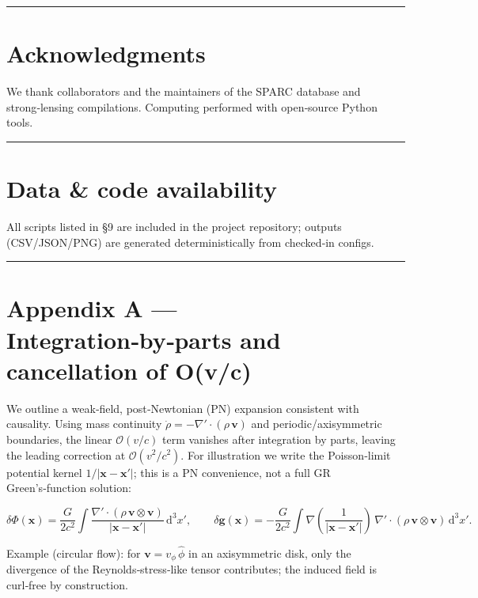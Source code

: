 \documentclass[11pt,a4paper]{article}
\begin{document}
\medskip\hrule\medskip


\section{Acknowledgments}


We thank collaborators and the maintainers of the SPARC database and strong‑lensing compilations. Computing performed with open‑source Python tools.


\medskip\hrule\medskip


\section{Data \& code availability}


All scripts listed in §9 are included in the project repository; outputs (CSV/JSON/PNG) are generated deterministically from checked‑in configs.


\medskip\hrule\medskip


\section{Appendix A — Integration‑by‑parts and cancellation of O(v/c)}


We outline a weak‑field, post‑Newtonian (PN) expansion consistent with causality. Using mass continuity $\dot\rho=-\nabla'\!\cdot(\rho\,\mathbf{v})$ and periodic/axisymmetric boundaries, the linear $\mathcal{O}(v/c)$ term vanishes after integration by parts, leaving the leading correction at $\mathcal{O}(v^2/c^2)$. For illustration we write the Poisson‑limit potential kernel $1/\lvert \mathbf{x}-\mathbf{x}'\rvert$; this is a PN convenience, not a full GR Green’s‑function solution:


\begin{equation}
\delta\Phi(\mathbf{x}) = \frac{G}{2c^2} \int \frac{\nabla'\!\cdot(\rho\,\mathbf{v}\!\otimes\!\mathbf{v})}{\lvert \mathbf{x}-\mathbf{x}'\rvert}\,\mathrm{d}^3\!x' ,\qquad
\delta\mathbf{g}(\mathbf{x}) = -\frac{G}{2c^2} \int \nabla\!\left(\frac{1}{\lvert \mathbf{x}-\mathbf{x}'\rvert}\right) \, \nabla'\!\cdot(\rho\,\mathbf{v}\!\otimes\!\mathbf{v})\,\mathrm{d}^3\!x' .
\end{equation}


Example (circular flow): for $\mathbf{v}=v_\phi\,\hat\phi$ in an axisymmetric disk, only the divergence of the Reynolds‑stress‑like tensor contributes; the induced field is curl‑free by construction.
\end{document}
